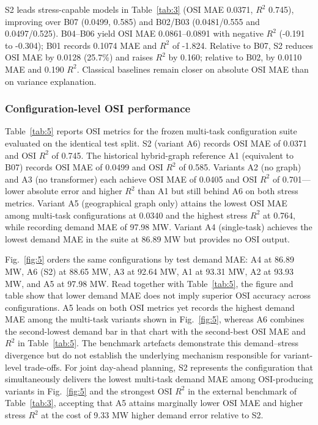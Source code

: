 S2 leads stress-capable models in Table~\ref{tab:3} (OSI MAE 0.0371, $R^2$ 0.745), improving over B07 (0.0499, 0.585) and B02/B03 (0.0481/0.555 and 0.0497/0.525). B04--B06 yield OSI MAE 0.0861--0.0891 with negative $R^2$ (-0.191 to -0.304); B01 records 0.1074 MAE and $R^2$ of -1.824. Relative to B07, S2 reduces OSI MAE by 0.0128 (25.7\%) and raises $R^2$ by 0.160; relative to B02, by 0.0110 MAE and 0.190 $R^2$. Classical baselines remain closer on absolute OSI MAE than on variance explanation.

\subsubsection{Configuration-level OSI performance}\label{subsubsection:configuration_level_osi_performance}

Table~\ref{tab:5} reports OSI metrics for the frozen multi-task configuration suite evaluated on the identical test split. S2 (variant A6) records OSI MAE of 0.0371 and OSI $R^2$ of 0.745. The historical hybrid-graph reference A1 (equivalent to B07) records OSI MAE of 0.0499 and OSI $R^2$ of 0.585. Variants A2 (no graph) and A3 (no transformer) each achieve OSI MAE of 0.0405 and OSI $R^2$ of 0.701---lower absolute error and higher $R^2$ than A1 but still behind A6 on both stress metrics. Variant A5 (geographical graph only) attains the lowest OSI MAE among multi-task configurations at 0.0340 and the highest stress $R^2$ at 0.764, while recording demand MAE of 97.98 MW. Variant A4 (single-task) achieves the lowest demand MAE in the suite at 86.89 MW but provides no OSI output.

Fig.~\ref{fig:5} orders the same configurations by test demand MAE: A4 at 86.89 MW, A6 (S2) at 88.65 MW, A3 at 92.64 MW, A1 at 93.31 MW, A2 at 93.93 MW, and A5 at 97.98 MW. Read together with Table~\ref{tab:5}, the figure and table show that lower demand MAE does not imply superior OSI accuracy across configurations. A5 leads on both OSI metrics yet records the highest demand MAE among the multi-task variants shown in Fig.~\ref{fig:5}, whereas A6 combines the second-lowest demand bar in that chart with the second-best OSI MAE and $R^2$ in Table~\ref{tab:5}. The benchmark artefacts demonstrate this demand--stress divergence but do not establish the underlying mechanism responsible for variant-level trade-offs. For joint day-ahead planning, S2 represents the configuration that simultaneously delivers the lowest multi-task demand MAE among OSI-producing variants in Fig.~\ref{fig:5} and the strongest OSI $R^2$ in the external benchmark of Table~\ref{tab:3}, accepting that A5 attains marginally lower OSI MAE and higher stress $R^2$ at the cost of 9.33 MW higher demand error relative to S2.

